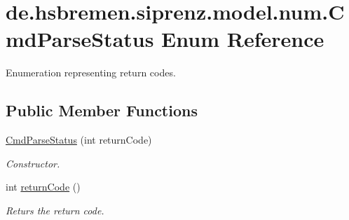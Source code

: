 \hypertarget{enumde_1_1hsbremen_1_1siprenz_1_1model_1_1num_1_1CmdParseStatus}{}\section{de.\+hsbremen.\+siprenz.\+model.\+num.\+Cmd\+Parse\+Status Enum Reference}
\label{enumde_1_1hsbremen_1_1siprenz_1_1model_1_1num_1_1CmdParseStatus}


Enumeration representing return codes.  


\subsection*{Public Member Functions}
\begin{DoxyCompactItemize}
\item 
\hyperlink{enumde_1_1hsbremen_1_1siprenz_1_1model_1_1num_1_1CmdParseStatus_a0eaa707cb3ba39696fe598aeb0b45443}{Cmd\+Parse\+Status} (int return\+Code)
\begin{DoxyCompactList}\small\item\em Constructor. \end{DoxyCompactList}\item 
int \hyperlink{enumde_1_1hsbremen_1_1siprenz_1_1model_1_1num_1_1CmdParseStatus_af33b78d974ef6fccb7d638ebf1a70ee8}{return\+Code} ()
\begin{DoxyCompactList}\small\item\em Returs the return code. \end{DoxyCompactList}\end{DoxyCompactItemize}
